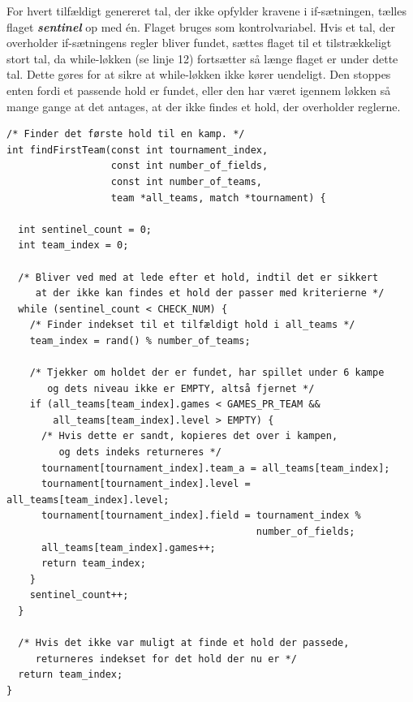 \par
For hvert tilfældigt genereret tal, der ikke opfylder kravene i if-sætningen, tælles flaget \textbf{\textit{sentinel}} op med én. Flaget bruges som kontrolvariabel. Hvis et tal, der overholder if-sætningens regler bliver fundet, sættes flaget til et tilstrækkeligt stort tal, da while-løkken (se linje 12) fortsætter så længe flaget er under dette tal. Dette gøres for at sikre at while-løkken ikke kører uendeligt. Den stoppes enten fordi et passende hold er fundet, eller den har været igennem løkken så mange gange at det antages, at der ikke findes et hold, der overholder reglerne. 
\clearpage
\begin{source}
\begin{verbatim}
/* Finder det første hold til en kamp. */
int findFirstTeam(const int tournament_index, 
                  const int number_of_fields, 
                  const int number_of_teams, 
                  team *all_teams, match *tournament) {
                  
  int sentinel_count = 0;
  int team_index = 0;

  /* Bliver ved med at lede efter et hold, indtil det er sikkert
     at der ikke kan findes et hold der passer med kriterierne */
  while (sentinel_count < CHECK_NUM) {
    /* Finder indekset til et tilfældigt hold i all_teams */
    team_index = rand() % number_of_teams;

    /* Tjekker om holdet der er fundet, har spillet under 6 kampe
       og dets niveau ikke er EMPTY, altså fjernet */
    if (all_teams[team_index].games < GAMES_PR_TEAM && 
        all_teams[team_index].level > EMPTY) {
      /* Hvis dette er sandt, kopieres det over i kampen, 
         og dets indeks returneres */
      tournament[tournament_index].team_a = all_teams[team_index];
      tournament[tournament_index].level = all_teams[team_index].level;
      tournament[tournament_index].field = tournament_index % 
                                           number_of_fields;
      all_teams[team_index].games++;
      return team_index;
    }
    sentinel_count++;
  }

  /* Hvis det ikke var muligt at finde et hold der passede,
     returneres indekset for det hold der nu er */
  return team_index;
}
\end{verbatim}
\label{code:findFirstTeam}
\end{source}
